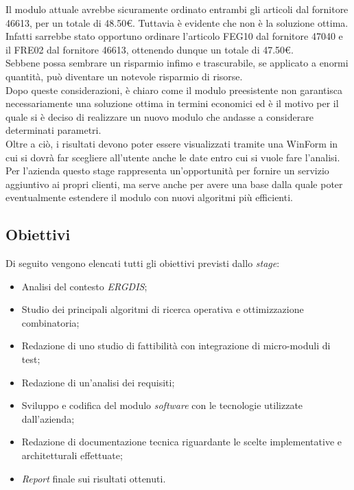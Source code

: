 \noindent Il modulo attuale avrebbe sicuramente ordinato entrambi gli articoli dal fornitore 46613,
per un totale di 48.50€. Tuttavia è evidente che non è la soluzione ottima.
Infatti sarrebbe stato opportuno ordinare l'articolo FEG10 dal fornitore 47040 e il
FRE02 dal fornitore 46613, ottenendo dunque un totale di 47.50€.\\
Sebbene possa sembrare un risparmio infimo e trascurabile, se applicato a enormi quantità, può
diventare un notevole risparmio di risorse.\\

\noindent Dopo queste considerazioni, è chiaro come il modulo preesistente non garantisca necessariamente una soluzione ottima in termini economici ed è il motivo per il quale
si è deciso di realizzare un nuovo modulo che andasse a considerare determinati parametri.\\

\noindent Oltre a ciò, i risultati devono poter essere visualizzati tramite una WinForm in cui si dovrà far scegliere all'utente
anche le date entro cui si vuole fare l'analisi.\\

\noindent Per l'azienda questo stage rappresenta un'opportunità per fornire un servizio aggiuntivo ai propri clienti, ma serve anche per avere una base
dalla quale poter eventualmente estendere il modulo con nuovi algoritmi più efficienti.
\subsection{Obiettivi}

\noindent Di seguito vengono elencati tutti gli obiettivi previsti dallo \textit{stage}:
\begin{itemize}
    \item Analisi del contesto \textit{ERGDIS};
    \item Studio dei principali algoritmi di ricerca operativa e ottimizzazione combinatoria;
    \item Redazione di uno studio di fattibilità con integrazione di micro-moduli di test;
    \item Redazione di un'analisi dei requisiti;
    \item Sviluppo e codifica del modulo \textit{software} con le tecnologie utilizzate dall'azienda;
    \item Redazione di documentazione tecnica riguardante le scelte implementative e architetturali effettuate;
    \item \textit{Report} finale sui risultati ottenuti.
\end{itemize}
